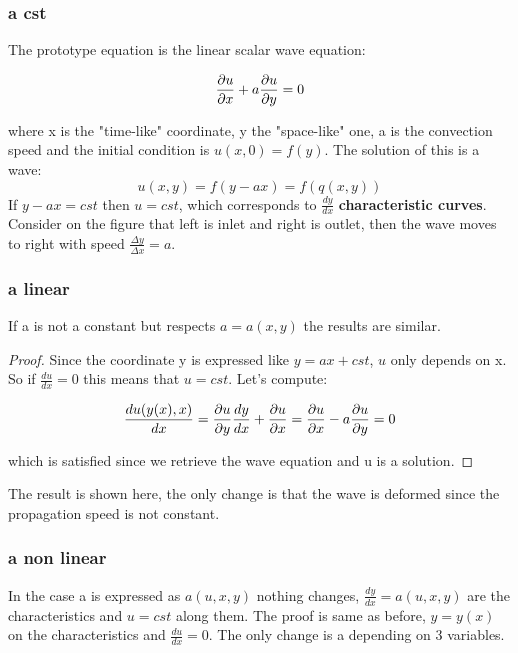 \subsubsection{a cst}	
	The prototype equation is the linear scalar wave equation: 
	
	\begin{equation}
	\frac{\D u}{\D x} + a \frac{\D u}{\D y} = 0
	\end{equation}
	
	where x is the "time-like" coordinate, y the "space-like" one, a is the convection speed and the initial condition is $u(x,0) = f(y)$. The solution of this is a wave: 
	\begin{equation}
	u(x,y) = f(y-ax) = f(q(x,y))
	\end{equation}
	If $y-ax = cst$ then $u= cst$, which corresponds to $\frac{dy}{dx}$ \textbf{characteristic curves}. Consider on the figure that left is inlet and right is outlet, then the wave moves to right with speed $\frac{\Delta y}{\Delta x} = a$. 
	
\subsubsection{a linear}
	If a is not a constant but respects $a = a(x,y)$ the results are similar. 
	
	\begin{proof}
	Since the coordinate y is expressed like $y = ax + cst$, $u$ only depends on x. So if $\frac{du}{dx} = 0$ this means that $u = cst$. Let's compute: 
	
	\begin{equation}
	\frac{du(y(x),x)}{dx} = \frac{\D u}{\D y} \frac{d y}{dx} + \frac{\D u}{\D x} = \frac{\D u}{\D x} -a \frac{\D u}{\D y} = 0
	\end{equation}
	
	which is satisfied since we retrieve the wave equation and u is a solution. 
	\end{proof}
	
	The result is shown here, the only change is that the wave is deformed since the propagation speed is not constant. 
	
	\subsubsection{a non linear}
	In the case a is expressed as $a(u,x,y)$ nothing changes, $\frac{dy}{dx} = a(u,x,y)$ are the characteristics and $u = cst$ along them. The proof is same as before, $y = y(x)$ on the characteristics and $\frac{du}{dx} = 0$. The only change is a depending on 3 variables.  
	
